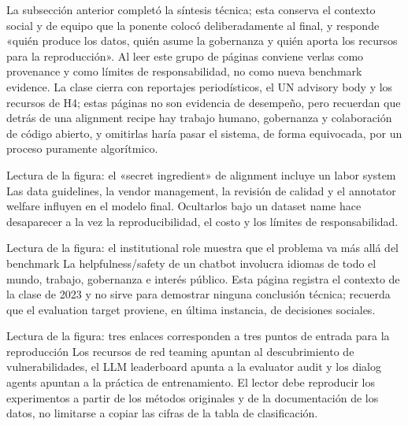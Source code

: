 La subsección anterior completó la síntesis técnica; esta conserva el contexto social y de equipo que la ponente colocó deliberadamente al final, y responde «quién produce los datos, quién asume la gobernanza y quién aporta los recursos para la reproducción». Al leer este grupo de páginas conviene verlas como provenance y como límites de responsabilidad, no como nueva benchmark evidence. La clase cierra con reportajes periodísticos, el UN advisory body y los recursos de H4; estas páginas no son evidencia de desempeño, pero recuerdan que detrás de una alignment recipe hay trabajo humano, gobernanza y colaboración de código abierto, y omitirlas haría pasar el sistema, de forma equivocada, por un proceso puramente algorítmico.


\begin{knowledgebox}{Lectura de la figura: el «secret ingredient» de alignment incluye un labor system}
Las data guidelines, la vendor management, la revisión de calidad y el annotator welfare influyen en el modelo final. Ocultarlos bajo un dataset name hace desaparecer a la vez la reproducibilidad, el costo y los límites de responsabilidad.
\end{knowledgebox}


\begin{knowledgebox}{Lectura de la figura: el institutional role muestra que el problema va más allá del benchmark}
La helpfulness/safety de un chatbot involucra idiomas de todo el mundo, trabajo, gobernanza e interés público. Esta página registra el contexto de la clase de 2023 y no sirve para demostrar ninguna conclusión técnica; recuerda que el evaluation target proviene, en última instancia, de decisiones sociales.
\end{knowledgebox}


\begin{knowledgebox}{Lectura de la figura: tres enlaces corresponden a tres puntos de entrada para la reproducción}
Los recursos de red teaming apuntan al descubrimiento de vulnerabilidades, el LLM leaderboard apunta a la evaluator audit y los dialog agents apuntan a la práctica de entrenamiento. El lector debe reproducir los experimentos a partir de los métodos originales y de la documentación de los datos, no limitarse a copiar las cifras de la tabla de clasificación.
\end{knowledgebox}

